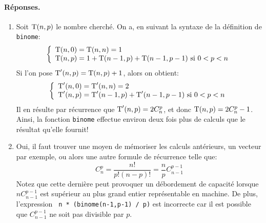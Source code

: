 \paragraph{Réponses.}

\begin{enumerate}

  \item Soit \(\textrm{T} (n,p)\) le nombre cherché. On a, en suivant la
    syntaxe de la définition de \texttt{binome}:
    \[\left\{
    \begin{array}{l}
      \textrm{T} (n,0) = \textrm{T} (n,n) = 1\\
      \textrm{T} (n,p) = 1 + \textrm{T} (n-1,p) + \textrm{T} (n-1,p-1) \ \textrm{si} \
      0 < p < n
    \end{array}
    \right.\]
    Si l'on pose $\textrm{T}' (n,p) = \textrm{T} (n,p) + 1$, alors on obtient:
    \[\left\{
    \begin{array}{l}
      \textrm{T}' (n,0) = \textrm{T}' (n,n) = 2\\
      \textrm{T}' (n,p) = \textrm{T}' (n-1,p) + \textrm{T}' (n-1,p-1) \ \textrm{si} \
      0 < p < n
    \end{array}
    \right.\]
    Il en résulte par récurrence que \(\textrm{T}'(n,p)=2 C_{n}^{p}\), et donc
    \(\textrm{T}(n,p)=2 C_{n}^{p} - 1\). Ainsi, la fonction \texttt{binome}
    effectue environ deux fois plus de calculs que le résultat qu'elle
    fournit!

  \item Oui, il faut trouver une moyen de mémoriser les calculs
    antérieurs, un vecteur par exemple, ou alors une autre formule de
    récurrence telle que:
    \[C_{n}^{p} = \frac{n!}{p! (n-p)!} = \frac{n}{p} C_{n-1}^{p-1}\]
    Notez que cette dernière peut provoquer un débordement de capacité
    lorsque \(n C_{n-1}^{p-1}\) est supérieur au plus grand entier
    représentable en machine. De plus, l'expression \texttt{ n *
      (binome(n-1,p-1) / p)} est incorrecte car il est possible que
    \(C_{n-1}^{p-1}\) ne soit pas divisible par \(p\).

\end{enumerate}
